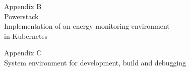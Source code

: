 \documentclass[
    11pt,                      %
    english,                   %
    singlespacing,             %
    liststotoc,               %
    parskip,                  %
    headsepline,               %
    consistentlayout,          %
]{MastersDoctoralThesis}
\begin{document}
\cleardoublepage
\setcounter{chapter}{0}
\setcounter{page}{1}






\newcommand{\vtOneTitle}{Powerstack: Implementation of an\newline energy monitoring environment in Kubernetes}
\newcommand{\vtOneType}{Specialization Project 1}
\newcommand{\vtOneDate}{January 31, 2025}
\cleardoublepage
\thispagestyle{empty} %

{}

\vspace*{3cm} %
\begin{center}
{\Huge Appendix B}\\[1em] %
{\Large Powerstack}\\[0.5em]
{\Large Implementation of an energy monitoring environment\\in Kubernetes}
\end{center}

\cleardoublepage
\setcounter{chapter}{0}
\setcounter{page}{1}



\IntentionallyBlankPage




\cleardoublepage
\thispagestyle{empty}

{}
\label{appendix_system_env}

\vspace*{3cm}
\begin{center}
{\Huge Appendix C}\\[1em]
{\Large System environment for development, build and debugging}
\end{center}
\end{document}
